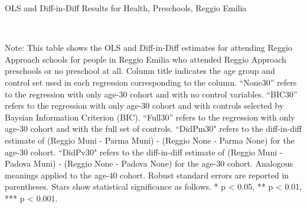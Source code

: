 \begin{landscape}

\begin{table}[H] \caption{OLS and Diff-in-Diff Results for Health, Preschools, Reggio Emilia} \label{ols-H-reg}
\scalebox{0.85}{
}
\vspace{1ex} \\
\footnotesize\raggedright{Note: This table shows the OLS and Diff-in-Diff estimates for attending Reggio Approach schools for people in Reggio Emilia who attended Reggio Approach preschools or no preschool at all. Column title indicates the age group and control set used in each regression corresponding to the column. ``None30'' refers to the regression with only age-30 cohort and with no control variables. ``BIC30'' refers to the regression with only age-30 cohort and with controls selected by Baysian Information Criterion (BIC). ``Full30'' refers to the regression with only age-30 cohort and with the full set of controls. ``DidPm30" refers to the diff-in-diff estimate of (Reggio Muni - Parma Muni) - (Reggio None - Parma None) for the age-30 cohort. ``DidPv30" refers to the diff-in-diff estimate of (Reggio Muni - Padova Muni) - (Reggio None - Padova None) for the age-30 cohort. Analogous meanings applied to the age-40 cohort. Robust standard errors are reported in parentheses. Stars show statistical significance as follows. * p < 0.05, ** p < 0.01, *** p < 0.001.}
\end{table}




\end{landscape}
